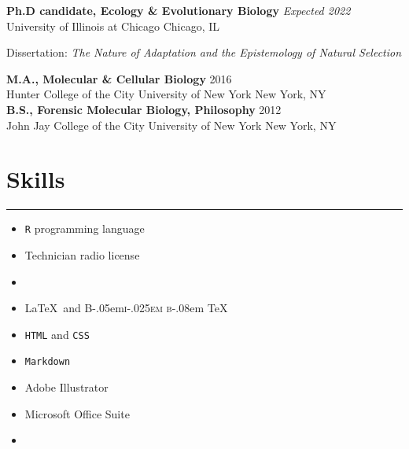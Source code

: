\documentclass[]{article}
\begin{document}
\textbf{Ph.D candidate, Ecology \& Evolutionary Biology} \hfill \textit{Expected 2022}\\ 
University of Illinois at Chicago \hfill Chicago, IL
     
Dissertation: \emph{The Nature of Adaptation and the Epistemology of Natural Selection} 
\vspace{0.3cm}

\textbf{M.A., Molecular \& Cellular Biology} \hfill 2016\\ 
Hunter College of the City University of New York \hfill New York, NY\\
     

\textbf{B.S., Forensic Molecular Biology, Philosophy} \hfill 2012\\ 
John Jay College of the City University of New York \hfill New York, NY

\section{Skills}
\hrule

\begin{multicols}{3}
\begin{itemize}
	\item[\textcolor{light-gray}{\faRProject}]{\texttt{R} programming language}
	\item[\textcolor{light-gray}{\faBroadcastTower}]{Technician radio license}
	\item[]{}
\end{itemize}

\columnbreak

\begin{itemize}
	\item[\textcolor{light-gray}{\faFilePdf}]{\LaTeX\ and \DeclareRobustCommand{\BibTeX}{%
  {\normalfont B\kern-.05em{\scshape i\kern-.025em b}\kern-.08em \TeX}%
}\BibTeX}
\item[\textcolor{light-gray}{\faFileCode}]{\texttt{HTML} and \texttt{CSS}}
\item[\textcolor{light-gray}{\faHighlighter}]{\texttt{Markdown}}
\end{itemize}

\columnbreak

\begin{itemize}
	\item[\textcolor{light-gray}{\faDraftingCompass}]{Adobe Illustrator}
	\item[\textcolor{light-gray}{\faMicrosoft}]{Microsoft Office Suite}
	\item[]{}
\end{itemize}

\end{multicols}
\end{document}
